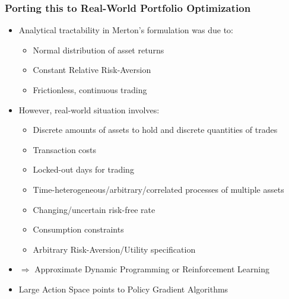 \documentclass[handout]{beamer}
\begin{document}
\begin{frame}
\frametitle{Porting this to Real-World Portfolio Optimization}
\pause
\begin{itemize}[<+->]
\item Analytical tractability in Merton's formulation was due to:
\begin{itemize}
\item Normal distribution of asset returns
\item Constant Relative Risk-Aversion
\item Frictionless, continuous trading
\end{itemize}
\item However, real-world situation involves:
\begin{itemize}
\item Discrete amounts of assets to hold and discrete quantities of trades
\item Transaction costs
\item Locked-out days for trading
\item Time-heterogeneous/arbitrary/correlated processes of multiple assets
\item Changing/uncertain risk-free rate
\item Consumption constraints
\item Arbitrary Risk-Aversion/Utility specification
\end{itemize}
\item $\Rightarrow$ Approximate Dynamic Programming or Reinforcement Learning
\item Large Action Space points to Policy Gradient Algorithms
\end{itemize}
\end{frame}
\end{document}
